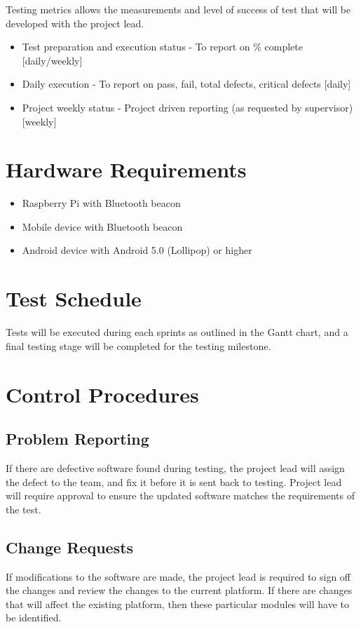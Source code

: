 \documentclass[12pt]{article}
\begin{document}
Testing metrics allows the measurements and level of success of test that will be developed with the project lead.
\begin{itemize}
    \item Test preparation and execution status - To report on \% complete [daily/weekly]
    \item Daily execution - To report on pass, fail, total defects, critical defects [daily]
    \item Project weekly status - Project driven reporting (as requested by supervisor) [weekly]
\end{itemize}

\section{Hardware Requirements}
\begin{itemize}
    \item Raspberry Pi with Bluetooth beacon
    \item Mobile device with Bluetooth beacon
    \item Android device with Android 5.0 (Lollipop) or higher
\end{itemize}

\section{Test Schedule}
Tests will be executed during each sprints as outlined in the Gantt chart, and a final testing stage will be completed for the testing milestone.

\section{Control Procedures}
\subsection{Problem Reporting}
If there are defective software found during testing, the project lead will assign the defect to the team, and fix it before it is sent back to testing. Project lead will require approval to ensure the updated software matches the requirements of the test.

\subsection{Change Requests}
If modifications to the software are made, the project lead is required to sign off the changes and review the changes to the current platform. If there are changes that will affect the existing platform, then these particular modules will have to be identified.
\end{document}
